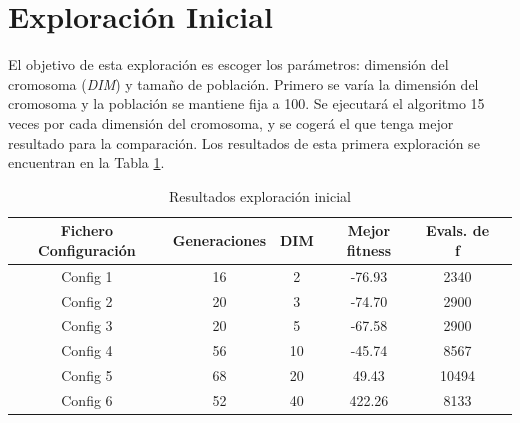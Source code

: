 \section{Exploración Inicial}

El objetivo de esta exploración es escoger los parámetros: dimensión del cromosoma (\textit{DIM}) y tamaño de población. Primero se varía la dimensión
del cromosoma y la población se mantiene fija a 100. Se ejecutará el algoritmo 15 veces por cada dimensión del cromosoma, y se cogerá el que 
tenga mejor resultado para la comparación. Los resultados de esta primera exploración se encuentran en la Tabla \ref{tab:fitness_variation}. 

\begin{table}[]
    \centering
    \begin{tabular}{||c|c|c|c|c|c||}
        \hline
        \textbf{Fichero Configuración} & \textbf{Generaciones} & \textbf{DIM} & \textbf{Mejor fitness} & \textbf{Evals. de f}\\ \hline
        Config 1   & 16    & 2   & -76.93    &  2340  \\ \hline
        Config 2   & 20    & 3   & -74.70    &  2900  \\ \hline
        Config 3   & 20    & 5   & -67.58    &  2900  \\ \hline
        Config 4   & 56    & 10  & -45.74    &  8567  \\ \hline
        Config 5   & 68    & 20  & 49.43     &  10494 \\ \hline
        Config 6   & 52    & 40  & 422.26    &  8133  \\ \hline
    \end{tabular}
    \caption{Resultados exploración inicial}
    \label{tab:fitness_variation}
\end{table}

